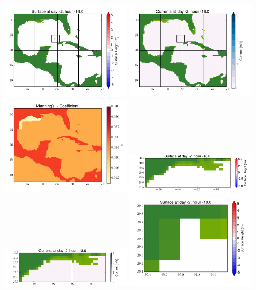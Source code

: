 \documentclass[11pt]{article}
\begin{document}
\vskip 10pt 
\includegraphics[width=0.475\textwidth]{frame0006fig1.png}
\includegraphics[width=0.475\textwidth]{frame0006fig2.png}
\vskip 10pt 
\includegraphics[width=0.475\textwidth]{frame0006fig3.png}
\includegraphics[width=0.475\textwidth]{frame0006fig4.png}
\vskip 10pt 
\includegraphics[width=0.475\textwidth]{frame0006fig5.png}
\includegraphics[width=0.475\textwidth]{frame0006fig6.png}
\end{document}
